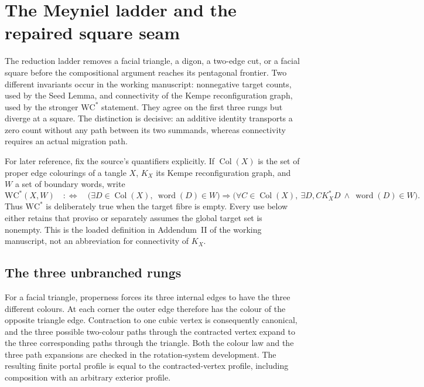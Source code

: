 %

\section{The Meyniel ladder and the repaired square seam}
\label{sec:meyniel-ladder}

The reduction ladder removes a facial triangle, a digon, a two-edge cut, or
a facial square before the compositional argument reaches its pentagonal
frontier.  Two different invariants occur in the working manuscript:
nonnegative target counts, used by the Seed Lemma, and connectivity of the
Kempe reconfiguration graph, used by the stronger \(\mathrm{WC}^{*}\)
statement.  They agree on the first three rungs but diverge at a square.
The distinction is decisive: an additive identity transports a zero count
without any path between its two summands, whereas connectivity requires an
actual migration path.

For later reference, fix the source's quantifiers explicitly.  If
\(\operatorname{Col}(X)\) is the set of proper edge colourings of a tangle
\(X\), \(K_X\) its Kempe reconfiguration graph, and \(W\) a set of boundary
words, write
\[
 \mathrm{WC}^{*}(X,W)\quad:\Longleftrightarrow\quad
 \bigl(\exists D\in\operatorname{Col}(X),\ \operatorname{word}(D)\in W\bigr)
 \Longrightarrow
 \bigl(\forall C\in\operatorname{Col}(X),\ \exists D,
   C\mathrel{K_X^{*}}D\ \wedge\ \operatorname{word}(D)\in W\bigr).
\]
Thus \(\mathrm{WC}^{*}\) is deliberately true when the target fibre is empty.
Every use below either retains that proviso or separately assumes the global
target set is nonempty.  This is the loaded definition in Addendum~II of the
working manuscript, not an abbreviation for connectivity of \(K_X\).

\subsection{The three unbranched rungs}

For a facial triangle, properness forces its three internal edges to have
the three different colours.  At each corner the outer edge therefore has
the colour of the opposite triangle edge.  Contraction to one cubic vertex
is consequently canonical, and the three possible two-colour paths through
the contracted vertex expand to the three corresponding paths through the
triangle.  Both the colour law and the three path expansions are checked in
the rotation-system development.
The resulting finite portal profile is equal to the contracted-vertex
profile, including composition with an arbitrary exterior profile.

